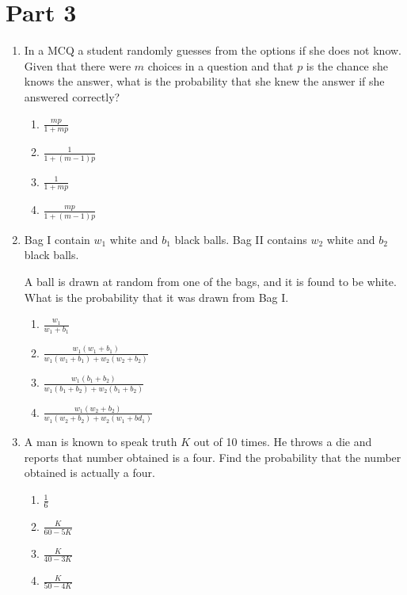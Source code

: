 \documentclass{article}
\begin{document}
\section{Part 3}
\begin{enumerate}
    \item In  a MCQ a student randomly guesses from the options if she does not know. Given that there were $m$ choices in a question and that $p$ is the chance she knows the answer, what is the probability that she knew the answer if she answered correctly?
    \begin{enumerate}
        \item $ \frac {mp} {1+mp} $
        \item $ \frac {1} {1+(m-1)p} $
        \item $ \frac {1} {1+mp} $
        \item $ \frac {mp} {1+(m-1)p} $
    \end{enumerate}

    \item Bag I contain $w_1$ white and $b_1$ black balls. Bag II contains $w_2$ white and $b_2$ black balls.

    A ball is drawn at random from one of the bags, and it is found to be white. What is the probability that it was drawn from Bag I.
    \begin{enumerate}
        \item $\frac{w_1}{w_1 + b_1}$
        \item $\frac{w_1(w_1+b_1)}{w_1(w_1+b_1) + w_2(w_2+b_2)}$
        \item $\frac{w_1(b_1+b_2)}{w_1(b_1+b_2) + w_2(b_1+b_2)}$
        \item $\frac{w_1(w_2+b_2)}{w_1(w_2+b_2) + w_2(w_1+b d_1)}$
    \end{enumerate}

    \item A man is known to speak truth $K$ out of 10 times. He throws a die and reports that number obtained is a four. Find the probability that the number obtained is actually a four.
    \begin{enumerate}
        \item $\frac 1 6$
        \item $\frac {K}{60-5K} $
        \item $\frac {K}{40-3K} $
        \item $\frac {K}{50-4K} $
    \end{enumerate}


\end{enumerate}
\end{document}
